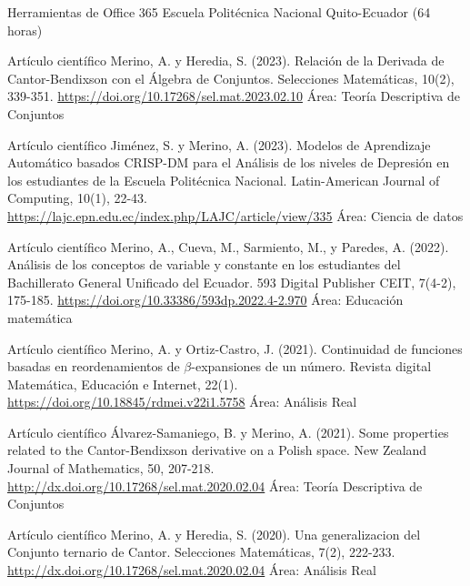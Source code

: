 \documentclass[
	a4paper,
	maincolor=cvblue!70!blue,
	sidecolor=gray!30,
	sectioncolor=cvblue!70!blue,
    sidebarwidth=7.5cm,
	topbottommargin=20pt,
	leftrightmargin=20pt,
]{fortysecondscv}
\begin{document}
    {Herramientas de Office 365}
    {Escuela Politécnica Nacional}
    {Quito-Ecuador (64 horas)}



    {Artículo científico}
    {Merino, A. y Heredia, S. (2023). Relación de la Derivada de Cantor-Bendixson con el Álgebra de Conjuntos. Selecciones Matemáticas, 10(2), 339-351.}
    {\url{https://doi.org/10.17268/sel.mat.2023.02.10}}
    {Área: Teoría Descriptiva de Conjuntos}
    
    {Artículo científico}
    {Jiménez, S. y Merino, A. (2023). Modelos de Aprendizaje Automático basados CRISP-DM para el Análisis de los niveles de Depresión en los estudiantes de la Escuela Politécnica Nacional. Latin-American Journal of Computing, 10(1), 22-43.}     
    {\url{https://lajc.epn.edu.ec/index.php/LAJC/article/view/335}}
    {Área: Ciencia de datos}
    
    {Artículo científico}
    {Merino, A., Cueva, M., Sarmiento, M., y Paredes, A. (2022). Análisis de los conceptos de variable y constante en los estudiantes del Bachillerato General Unificado del Ecuador. 593 Digital Publisher CEIT, 7(4-2), 175-185.}     
    {\url{https://doi.org/10.33386/593dp.2022.4-2.970}}
    {Área: Educación matemática}
    
    {Artículo científico}
    {Merino, A. y Ortiz-Castro, J. (2021). Continuidad de funciones basadas en reordenamientos de $\beta$-expansiones de un número. Revista digital Matemática, Educación e Internet, 22(1).}     
    {\url{https://doi.org/10.18845/rdmei.v22i1.5758}}
    {Área: Análisis Real}
    
    {Artículo científico}
    {Álvarez-Samaniego, B. y Merino, A. (2021). Some properties related to the Cantor-Bendixson derivative on a Polish space. New Zealand Journal of Mathematics, 50, 207-218.}     {\url{http://dx.doi.org/10.17268/sel.mat.2020.02.04}}
    {Área: Teoría Descriptiva de Conjuntos}
    
    {Artículo científico}
    {Merino, A. y Heredia, S. (2020). Una generalizacion del Conjunto ternario de Cantor. Selecciones Matemáticas, 7(2), 222-233.}     {\url{http://dx.doi.org/10.17268/sel.mat.2020.02.04}}
    {Área: Análisis Real}
    
\end{document}
